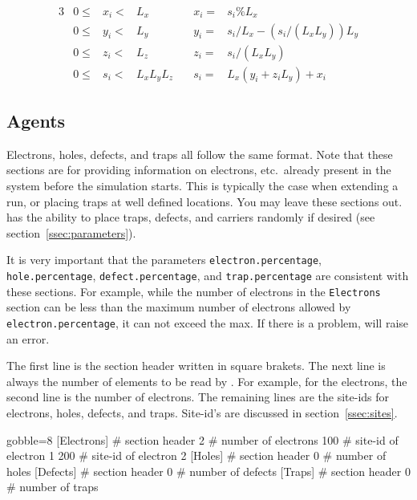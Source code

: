     \begin{alignat}{3}
        \label{eqn:xrange}
        & 0 \leq & x_{i} < & L_{x} & x_{i} =& s_{i} \% L_{x} \\
        \label{eqn:yrange}
        & 0 \leq & y_{i} < & L_{y} & y_{i} =& s_{i} / L_{x} - (s_{i}/(L_{x}L_{y})) L_{y} \\
        \label{eqn:zrange}
        & 0 \leq & z_{i} < & L_{z} & z_{i} =& s_{i} / (L_{x}L_{y}) \\
        \label{eqn:srange}
        & 0 \leq & s_{i} < & L_{x} L_{y} L_{z} \quad & s_{i} =& L_{x} (y_{i} + z_{i} L_{y})+ x_{i}
    \end{alignat}

\newpage
\subsection{Agents}
    \label{ssec:agents}
    Electrons, holes, defects, and traps all follow the same format.
    Note that these sections are for providing information on
        electrons, etc.\ already present in the system before the
        simulation starts.
    This is typically the case when extending a run, or placing
        traps at well defined locations.
    You may leave these sections out.
    \Langmuir has the ability to place traps, defects, and carriers
        randomly if desired (see section~\ref{ssec:parameters}).

    It is very important that the parameters
        \verb|electron.percentage|, \verb|hole.percentage|,
        \verb|defect.percentage|, and \verb|trap.percentage|
        are consistent with these sections.
    For example, while the number of electrons in the \verb|Electrons|
        section can be less than the maximum number of electrons
        allowed by \verb|electron.percentage|, it can not exceed
        the max.
    If there is a problem, \langmuir will raise an error.

    The first line is the section header written in square brakets.
    The next line is always the number of elements to be read by
        \langmuir.
    For example, for the electrons, the second line is the number of
        electrons.
    The remaining lines are the site-ids for electrons, holes, defects,
        and traps.
    Site-id's are discussed in section~\ref{ssec:sites}.

    \begin{bashcode*}{gobble=8}
        [Electrons]    # section header
        2              # number of electrons
        100            # site-id of electron 1
        200            # site-id of electron 2
        [Holes]        # section header
        0              # number of holes
        [Defects]      # section header
        0              # number of defects
        [Traps]        # section header
        0              # number of traps
    \end{bashcode*}

